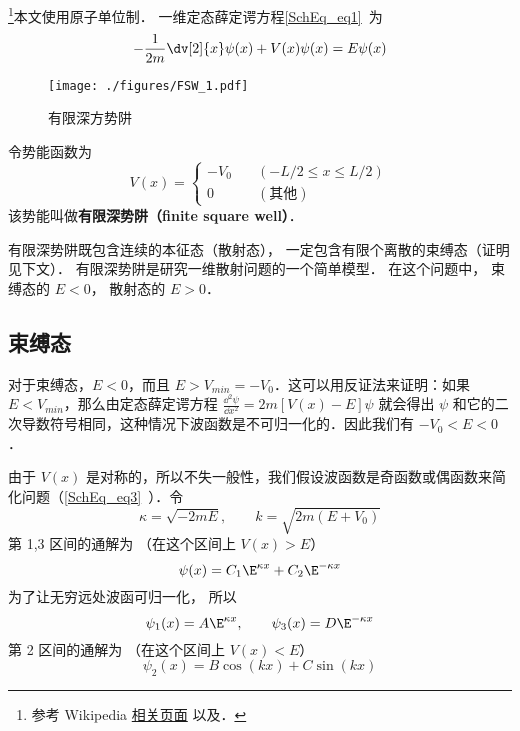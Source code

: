 
\begin{issues}
\issueTODO
\end{issues}




\footnote{参考 Wikipedia \href{https://en.wikipedia.org/wiki/Finite_potential_well}{相关页面} 以及\cite{GriffQ}．}本文使用原子单位制． 一维定态薛定谔方程\autoref{SchEq_eq1}~为
\begin{equation}
-\frac{1}{2m}\dv[2]{x}\psi(x) + V(x) \psi(x) = E \psi(x)
\end{equation}

\begin{figure}[ht]
\centering
\texttt{[image: ./figures/FSW\_1.pdf]}
\caption{有限深方势阱} \label{FSW_fig1}
\end{figure}
令势能函数为
\begin{equation}
V(x) = \begin{cases}
-V_0 \quad &(-L/2 \leqslant x \leqslant L/2)\\
0 \quad &(\text{其他})
\end{cases}
\end{equation}
该势能叫做\textbf{有限深势阱（finite square well）}．

有限深势阱既包含连续的本征态（散射态）， 一定包含有限个离散的束缚态（证明见下文）． 有限深势阱是研究一维散射问题的一个简单模型． 在这个问题中， 束缚态的 $E<0$， 散射态的 $E>0$．

\subsection{束缚态}
对于束缚态，$E<0$，而且 $E> V_{min}=-V_0$．这可以用反证法来证明：如果 $E<V_{min}$，那么由定态薛定谔方程 $\frac{\dd {^2}\psi}{\dd x^2}=2m[V(x)-E]\psi$ 就会得出 $\psi$ 和它的二次导数符号相同，这种情况下波函数是不可归一化的．因此我们有 $-V_0<E<0$．

由于 $V(x)$ 是对称的，所以不失一般性，我们假设波函数是奇函数或偶函数来简化问题（\autoref{SchEq_eq3}~）．令
\begin{equation}\label{FSW_eq4}
\kappa = \sqrt{-2mE}, \qquad k = \sqrt{2m(E + V_0)}
\end{equation}
第 1,3 区间的通解为 （在这个区间上 $V(x) > E$）
\begin{equation}
\psi(x) = C_1 \E^{\kappa x} + C_2 \E^{-\kappa x}
\end{equation}
为了让无穷远处波函可归一化， 所以
\begin{equation}
\psi_1(x) = A \E^{\kappa x}, \qquad \psi_3(x) = D\E^{-\kappa x}
\end{equation}
第 2 区间的通解为 （在这个区间上 $V(x) < E$）
\begin{equation}
\psi_2(x) = B \cos(k x) + C\sin(k x)
\end{equation}


